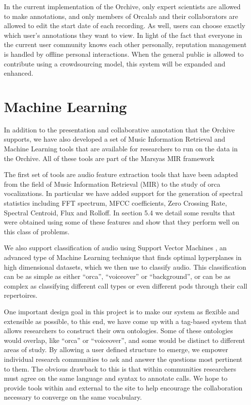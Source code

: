 In the current implementation of the Orchive, only expert scientists
are allowed to make annotations, and only members of Orcalab and their
collaborators are allowed to edit the start date of each recording.
As well, users can choose exactly which user's annotations they want
to view.  In light of the fact that everyone in the current user
community knows each other personally, reputation management is
handled by offline personal interactions.  When the general public is
allowed to contribute using a crowdsourcing model, this system will be
expanded and enhanced.

\section{Machine Learning}

In addition to the presentation and collaborative annotation that the
Orchive supports, we have also developed a set of Music Information
Retrieval and Machine Learning tools that are available for
researchers to run on the data in the Orchive. All of these tools are
part of the Marsyas \cite{marsyas} MIR framework

The first set of tools are audio feature extraction tools that have
been adapted from the field of Music Information Retrieval
(MIR) \cite{futrelledownie2002} to the study of orca vocalizations.
In particular we have added support for the generation of spectral
statistics including FFT spectrum, MFCC coefficients, Zero Crossing
Rate, Spectral Centroid, Flux and Rolloff.  In section 5.4 we detail
some results that were obtained using some of these features and show
that they perform well on this class of problems.

We also support classification of audio using Support Vector
Machines \cite{mandel-ismir2005}, an advanced type of Machine Learning
technique that finds optimal hyperplanes in high dimensional datasets,
which we then use to classify audio.  This classification can be as
simple as either ``orca'', ``voiceover'' or ``background'', or can be
as complex as classifying different call types or even different pods
through their call repertoires.  

One important design goal in this project is to make our system as
flexible and extensible as possible, to this end, we have come up with
a tag-based system that allows researchers to construct their own
ontologies.  Some of these ontologies would overlap, like ``orca'' or
``voiceover'', and some would be distinct to different areas of study.
By allowing a user defined structure to emerge, we empower individual
research communities to ask and answer the questions most pertinent to
them.  The obvious drawback to this is that within communities
researchers must agree on the same language and syntax to annotate
calls.  We hope to provide tools within and external to the site to
help encourage the collaboration necessary to converge on the same
vocabulary.


